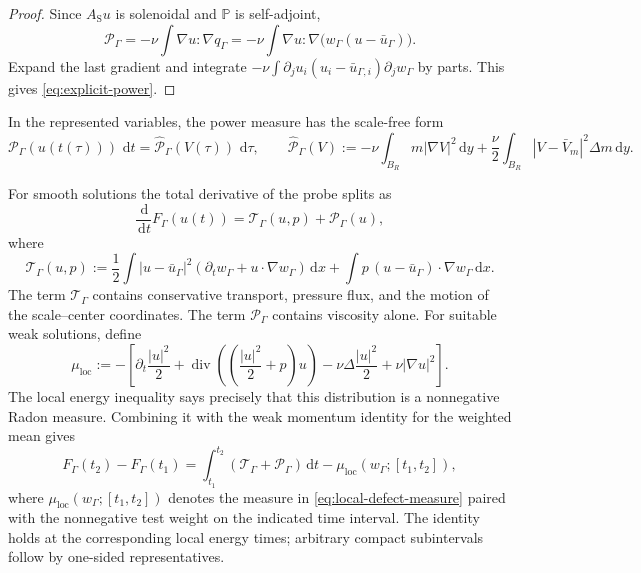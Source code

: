 \documentclass[11pt]{amsart}
\numberwithin{equation}{section}
\theoremstyle{plain}
\theoremstyle{definition}
\theoremstyle{remark}
\newcommand{\dd}{\,\mathrm d}
\newcommand{\Pdiv}{\mathbb P}
\newcommand{\diver}{\operatorname{div}}
\newcommand{\Power}{\mathcal P}
\newcommand{\Tgeom}{\mathcal T}
\begin{document}
\begin{proof}
Since \(A_{\mathrm S}u\) is solenoidal and \(\Pdiv\) is self-adjoint,
\[
 \Power_\Gamma
 =-\nu\int\nabla u:\nabla q_\Gamma
 =-\nu\int\nabla u:\nabla\bigl(w_\Gamma(u-\bar u_\Gamma)\bigr).
\]
Expand the last gradient and integrate
\(-\nu\int \partial_j u_i(u_i-\bar u_{\Gamma,i})
\partial_jw_\Gamma\) by parts.  This gives
\eqref{eq:explicit-power}.
\end{proof}

In the represented variables, the power measure has the scale-free form
\begin{equation}\label{eq:chart-power}
 \Power_\Gamma(u(t(\tau)))\,\dd t
 =\widehat{\Power}_\Gamma(V(\tau))\,\dd\tau,
 \qquad
 \widehat{\Power}_\Gamma(V)
 :=-\nu\int_{B_R}m|\nabla V|^2\dd y
 +\frac{\nu}{2}\int_{B_R}|V-\bar V_m|^2\Delta m\dd y.
\end{equation}

For smooth solutions the total derivative of the probe splits as
\begin{equation}\label{eq:probe-balance}
 \frac{\dd}{\dd t}F_\Gamma(u(t))
 =\Tgeom_\Gamma(u,p)+\Power_\Gamma(u),
\end{equation}
where
\begin{equation}\label{eq:geometric-transport}
 \Tgeom_\Gamma(u,p)
 :=\frac12\int|u-\bar u_\Gamma|^2
       (\partial_t w_\Gamma+u\cdot\nabla w_\Gamma)\dd x
 +\int p\,(u-\bar u_\Gamma)\cdot\nabla w_\Gamma\dd x.
\end{equation}
The term \(\Tgeom_\Gamma\) contains conservative transport, pressure flux,
and the motion of the scale--center coordinates.  The term
\(\Power_\Gamma\) contains viscosity alone.  For suitable weak solutions,
define
\begin{equation}\label{eq:local-defect-measure}
 \mu_{\mathrm{loc}}
 :=-\left[
 \partial_t\frac{|u|^2}{2}
 +\diver\left(\left(\frac{|u|^2}{2}+p\right)u\right)
 -\nu\Delta\frac{|u|^2}{2}
 +\nu|\nabla u|^2
 \right].
\end{equation}
The local energy inequality says precisely that this distribution is a
nonnegative Radon measure.  Combining it with the weak momentum identity for
the weighted mean gives
\begin{equation}\label{eq:weak-probe-balance}
 F_\Gamma(t_2)-F_\Gamma(t_1)
 =\int_{t_1}^{t_2}(\Tgeom_\Gamma+\Power_\Gamma)\dd t
 -\mu_{\mathrm{loc}}(w_\Gamma;[t_1,t_2]),
\end{equation}
where \(\mu_{\mathrm{loc}}(w_\Gamma;[t_1,t_2])\) denotes the measure in
\eqref{eq:local-defect-measure} paired with the nonnegative test weight on the
indicated time interval.  The identity holds at the corresponding local
energy times; arbitrary compact subintervals follow by one-sided
representatives.
\end{document}
